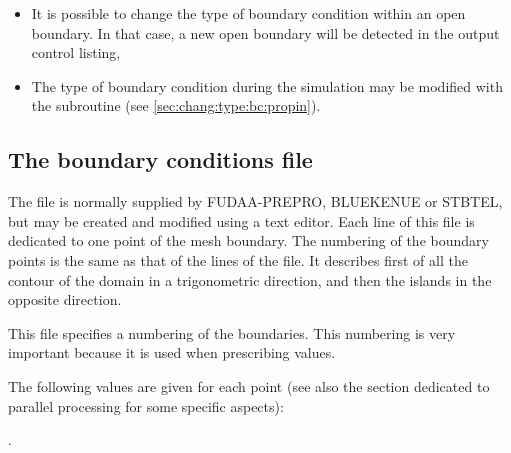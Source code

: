 \begin{itemize}
\item It is possible to change the type of boundary condition within an open
boundary.
In that case, a new open boundary will be detected in the output control listing,

\item The type of boundary condition during the simulation may be modified with
the  subroutine (see \ref{sec:chang:type:bc:propin}).
\end{itemize}


\subsection{The boundary conditions file}
\label{sub:bc:file}
The file is normally supplied by FUDAA-PREPRO, BLUEKENUE or STBTEL,
but may be created and modified using a text editor.
Each line of this file is dedicated to one point of the mesh boundary.
The numbering of the boundary points is the same as that of the lines of the
file.
It describes first of all the contour of the domain in a trigonometric direction,
and then the islands in the opposite direction.

This file specifies a numbering of the boundaries.
This numbering is very important because it is used when prescribing values.

The following values are given for each point
(see also the section dedicated to parallel processing for some specific aspects):

.

